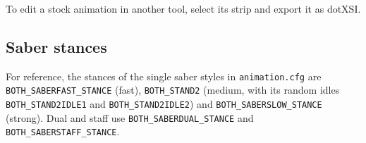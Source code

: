 \documentclass[a4paper,10pt]{article}
\begin{document}
 To edit a stock animation in another tool, select its strip and export it as dotXSI.

 \subsection*{Saber stances}

 For reference, the stances of the single saber styles in \texttt{animation.cfg} are
 \texttt{BOTH\_SABERFAST\_STANCE} (fast), \texttt{BOTH\_STAND2} (medium, with its random idles
 \texttt{BOTH\_STAND2IDLE1} and \texttt{BOTH\_STAND2IDLE2}) and \texttt{BOTH\_SABERSLOW\_STANCE}
 (strong). Dual and staff use \texttt{BOTH\_SABERDUAL\_STANCE} and \texttt{BOTH\_SABERSTAFF\_STANCE}.
\end{document}
